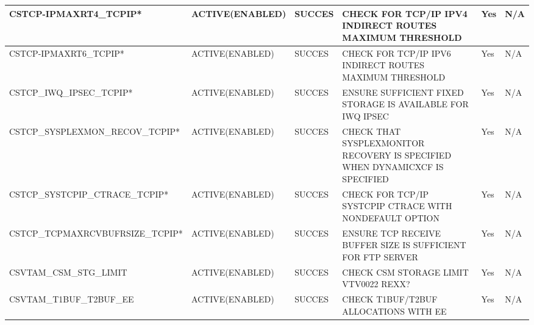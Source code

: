 \begin{landscape}
	\begin{table}[h]
		\begin{tabular}{|l|l|l|p{4.5cm}|l|l|}
			\hline
			CSTCP-IPMAXRT4\_TCPIP*           & ACTIVE(ENABLED)  & SUCCES & CHECK   FOR TCP/IP IPV4 INDIRECT ROUTES    MAXIMUM   THRESHOLD                      & Yes & N/A \\ \hline
			CSTCP-IPMAXRT6\_TCPIP*           & ACTIVE(ENABLED)  & SUCCES & CHECK   FOR TCP/IP IPV6 INDIRECT ROUTES    MAXIMUM   THRESHOLD                      & Yes & N/A \\ \hline
			CSTCP\_IWQ\_IPSEC\_TCPIP*        & ACTIVE(ENABLED)  & SUCCES & ENSURE SUFFICIENT FIXED STORAGE IS   AVAILABLE FOR IWQ IPSEC                        & Yes & N/A \\ \hline
			CSTCP\_SYSPLEXMON\_RECOV\_TCPIP* & ACTIVE(ENABLED)  & SUCCES & CHECK   THAT SYSPLEXMONITOR RECOVERY IS    SPECIFIED   WHEN DYNAMICXCF IS SPECIFIED & Yes & N/A \\ \hline
			CSTCP\_SYSTCPIP\_CTRACE\_TCPIP*  & ACTIVE(ENABLED)  & SUCCES & CHECK   FOR TCP/IP SYSTCPIP CTRACE WITH   NONDEFAULT   OPTION                       & Yes & N/A \\ \hline
			CSTCP\_TCPMAXRCVBUFRSIZE\_TCPIP* & ACTIVE(ENABLED)  & SUCCES & ENSURE   TCP RECEIVE BUFFER SIZE IS    SUFFICIENT   FOR FTP SERVER                  & Yes & N/A \\ \hline
			CSVTAM\_CSM\_STG\_LIMIT          & ACTIVE(ENABLED)  & SUCCES & CHECK CSM STORAGE LIMIT    VTV0022 REXX?                                            & Yes & N/A \\ \hline
			CSVTAM\_T1BUF\_T2BUF\_EE         & ACTIVE(ENABLED)  & SUCCES & CHECK   T1BUF/T2BUF ALLOCATIONS WITH EE                                             & Yes & N/A \\ \hline

		\end{tabular}
	\end{table}
\end{landscape}

